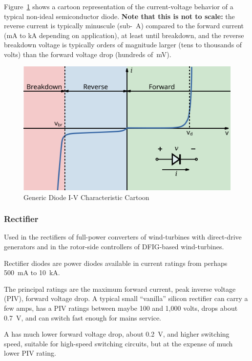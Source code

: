 \documentclass[11pt]{article}
\newlength\onenarrow
\begin{document}
Figure~\ref{fig:ivdiode} shows a cartoon representation of the
current-voltage behavior of a typical non-ideal semiconductor
diode. {\bf Note that this is not to scale: }the reverse current is
typically minuscule (sub-\unit{\mu A}) compared to the forward current
(\unit{mA} to \unit{kA} depending on application), at least until
breakdown, and the reverse breakdown voltage is typically orders of
magnitude larger (tens to thousands of volts) than the forward voltage
drop (hundreds of~\unit{mV}).

\begin{figure}[ht]
  \centering
  \includegraphics[width=\onenarrow]{ivdiode}
  \caption{Generic Diode I-V Characteristic Cartoon}
  \label{fig:ivdiode}
\end{figure}


\subsubsection{Rectifier}

Used in the rectifiers of full-power converters of wind-turbines with
direct-drive generators and in the rotor-side controllers of
DFIG-based wind-turbines.

Rectifier diodes are power diodes available in current ratings from
perhaps 500~\unit{mA} to 10~\unit{kA}.

The principal ratings are the maximum forward current, peak inverse
voltage (PIV), forward voltage drop. A typical small ``vanilla''
silicon rectifier can carry a few amps, has a PIV ratings between
maybe 100 and 1,000 volts, drops about 0.7~\unit{V}, and can switch
fast enough for mains service.

A  has much lower forward voltage drop, about
0.2~\unit{V}, and higher switching speed, suitable for high-speed
switching circuits, but at the expense of much lower PIV rating.
\end{document}
